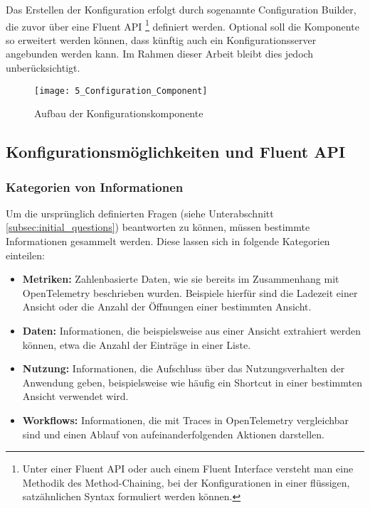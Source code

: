 Das Erstellen der Konfiguration erfolgt durch sogenannte Configuration Builder, die zuvor über eine Fluent API \footnote{Unter einer Fluent API oder auch einem Fluent Interface \cite{Fowler2005FluentInterface} versteht man eine Methodik des Method-Chaining, bei der Konfigurationen in einer flüssigen, satzähnlichen Syntax formuliert werden können.} definiert werden. Optional soll die Komponente so erweitert werden können, dass künftig auch ein Konfigurationsserver angebunden werden kann. Im Rahmen dieser Arbeit bleibt dies jedoch unberücksichtigt.

\begin{figure}[H]
    \centering
    \texttt{[image: 5\_Configuration\_Component]}
    \caption{Aufbau der Konfigurationskomponente}
    \label{fig:configuration_component}
\end{figure}

\subsection{Konfigurationsmöglichkeiten und Fluent API}

\subsubsection{Kategorien von Informationen}
Um die ursprünglich definierten Fragen (siehe Unterabschnitt \ref{subsec:initial_questions}) beantworten zu können, müssen bestimmte Informationen gesammelt werden. Diese lassen sich in folgende Kategorien einteilen:

\begin{itemize}
    \item \textbf{Metriken:} Zahlenbasierte Daten, wie sie bereits im Zusammenhang mit OpenTelemetry beschrieben wurden. Beispiele hierfür sind die Ladezeit einer Ansicht oder die Anzahl der Öffnungen einer bestimmten Ansicht.
    \item \textbf{Daten:} Informationen, die beispielsweise aus einer Ansicht extrahiert werden können, etwa die Anzahl der Einträge in einer Liste.
    \item \textbf{Nutzung:} Informationen, die Aufschluss über das Nutzungsverhalten der Anwendung geben, beispielsweise wie häufig ein Shortcut in einer bestimmten Ansicht verwendet wird.
    \item \textbf{Workflows:} Informationen, die mit Traces in OpenTelemetry vergleichbar sind und einen Ablauf von aufeinanderfolgenden Aktionen darstellen.
\end{itemize}

